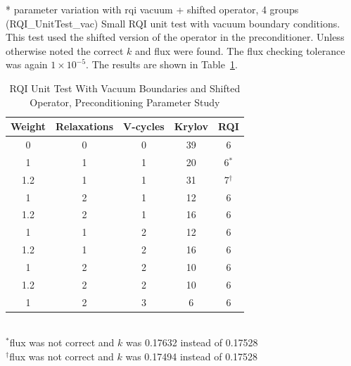 * parameter variation with rqi vacuum + shifted operator, 4 groups (RQI\_UnitTest\_vac)
Small RQI unit test with vacuum boundary conditions. This test used the shifted version of the operator in the preconditioner. Unless otherwise noted the correct $k$ and flux were found. The flux checking tolerance was again $1 \times 10^{-5}$. The results are shown in Table~\ref{table:RQIUnitTestVacShifted}.
%
\begin{table}[!h]
\caption{RQI Unit Test With Vacuum Boundaries and Shifted Operator, Preconditioning Parameter Study}
\begin{center}
\begin{tabular}{c c c c c}
\hline
Weight & Relaxations & V-cycles & Krylov & RQI \\[0.5ex]
\hline
0    & 0 & 0 & 39 & 6 \\
1    & 1 & 1 & 20 & 6$^{*}$ \\
1.2 & 1 & 1 & 31 & 7$^{\dagger}$ \\
1    & 2 & 1 & 12 & 6 \\
1.2 & 2 & 1 & 16 & 6 \\
1    & 1 & 2 & 12 & 6 \\
1.2 & 1 & 2 & 16 & 6 \\
1    & 2 & 2 & 10 & 6 \\
1.2 & 2 & 2 & 10 & 6 \\
1    & 2 & 3 & 6   & 6 \\
\hline 
\end{tabular}\\
$^{*}$flux was not correct and $k$ was 0.17632 instead of 0.17528 \\
 $^{\dagger}$flux was not correct and $k$ was 0.17494 instead of 0.17528
\end{center}
\label{table:RQIUnitTestVacShifted}
\end{table}

